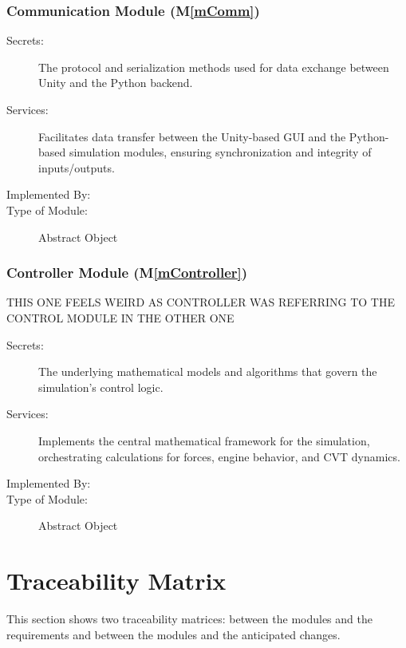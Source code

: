 \documentclass[12pt, titlepage]{article}
\newcommand{\mref}[1]{M\ref{#1}}
\begin{document}
\subsubsection{Communication Module (\mref{mComm})}

\begin{description}
\item[Secrets:] The protocol and serialization methods used for data exchange between Unity and the Python backend.
\item[Services:] Facilitates data transfer between the Unity-based GUI and the Python-based simulation modules, ensuring synchronization and integrity of inputs/outputs.
\item[Implemented By:] \progname{}
\item[Type of Module:] Abstract Object
\end{description}

\subsubsection{Controller Module (\mref{mController})}
THIS ONE FEELS WEIRD AS CONTROLLER WAS REFERRING TO THE CONTROL MODULE IN THE OTHER ONE

\begin{description}
\item[Secrets:] The underlying mathematical models and algorithms that govern the simulation's control logic.
\item[Services:] Implements the central mathematical framework for the simulation, orchestrating calculations for forces, engine behavior, and CVT dynamics.
\item[Implemented By:] \progname{}
\item[Type of Module:] Abstract Object
\end{description}

\section{Traceability Matrix} \label{SecTM}

This section shows two traceability matrices: between the modules and the
requirements and between the modules and the anticipated changes.
\end{document}
